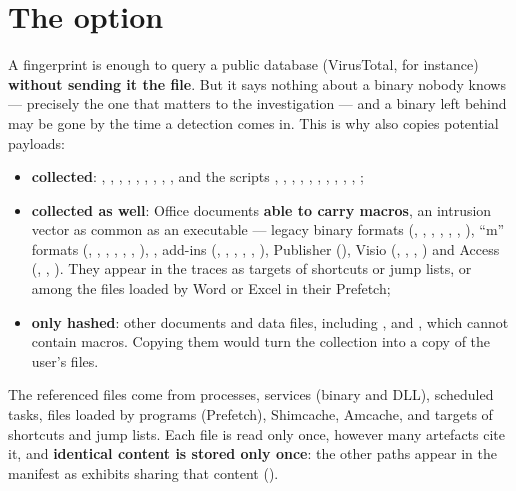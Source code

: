 \documentclass[11pt,a4paper,oneside]{report}
\begin{document}
\section{The  option}\label{sec:binary}

A fingerprint is enough to query a public database (VirusTotal, for instance)
\textbf{without sending it the file}. But it says nothing about a binary nobody
knows — precisely the one that matters to the investigation — and a binary left
behind may be gone by the time a detection comes in. This is why 
also copies potential payloads:

\begin{itemize}
  \item \textbf{collected}: , , ,
        , , , ,
        , ,  and the scripts
        , , , ,
        , , , ,
        , , ;
  \item \textbf{collected as well}: Office documents \textbf{able to carry
        macros}, an intrusion vector as common as an executable — legacy binary
        formats (, , , ,
        , , ), ``m'' formats
        (, , , ,
        , , ), , add-ins
        (, , , ,
        , ), Publisher (), Visio
        (, , , ) and
        Access (, , ). They appear in
        the traces as targets of shortcuts or jump lists, or among the files
        loaded by Word or Excel in their Prefetch;
  \item \textbf{only hashed}: other documents and data files, including
        ,  and , which cannot contain
        macros. Copying them would turn the collection into a copy of the
        user's files.
\end{itemize}

The referenced files come from processes, services (binary and DLL), scheduled
tasks, files loaded by programs (Prefetch), Shimcache, Amcache, and targets of
shortcuts and jump lists. Each file is read only once, however many artefacts
cite it, and \textbf{identical content is stored only once}: the other paths
appear in the manifest as exhibits sharing that content
().
\end{document}
